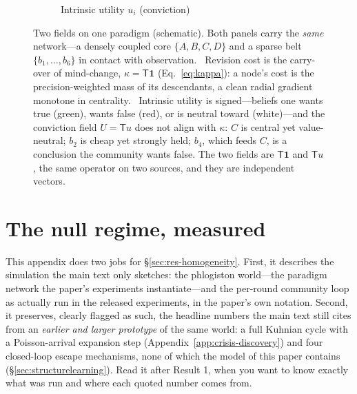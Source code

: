 \documentclass[runningheads]{llncs}
\newcommand{\Top}{\mathsf{T}}          %
\newcommand{\bone}{\mathbf{1}}         %
\begin{document}
\begin{figure}[h!]
\begin{subfigure}{0.49\textwidth}
\caption{Intrinsic utility $u_i$ (conviction)}
\label{sub:util}
\end{subfigure}
\caption{Two fields on one paradigm (schematic). Both panels carry the \emph{same} network---a densely
coupled core $\{A,B,C,D\}$ and a sparse belt $\{b_1,\dots,b_6\}$ in contact with observation.
~Revision cost is the carry-over of mind-change, $\kappa=\Top\bone$
(Eq.~\ref{eq:kappa}): a node's cost is the precision-weighted mass of its descendants, a clean radial
gradient monotone in centrality. ~Intrinsic utility is signed---beliefs one wants
true (green), wants false (red), or is neutral toward (white)---and the conviction field
$U=\Top u$ does not align with $\kappa$: $C$ is central yet value-neutral; $b_2$ is cheap yet strongly
held; $b_4$, which feeds $C$, is a conclusion the community wants false. The two fields are
$\Top\bone$ and $\Top u$, the same operator on two sources, and they are independent vectors.}
\label{fig:twofields}
\end{figure}

\section{The null regime, measured}
\label{app:null}

This appendix does two jobs for \S\ref{sec:res-homogeneity}. First, it describes the
simulation the main text only sketches: the phlogiston world---the paradigm network the
paper's experiments instantiate---and the per-round community loop as actually run in the
released experiments, in the paper's own notation. Second, it preserves, clearly flagged as
such, the headline numbers the main text still cites from an \emph{earlier and larger
prototype} of the same world: a full Kuhnian cycle with a Poisson-arrival expansion step
(Appendix~\ref{app:crisis-discovery}) and four closed-loop escape mechanisms, none of which
the model of this paper contains (\S\ref{sec:structurelearning}). Read it after Result 1,
when you want to know exactly what was run and where each quoted number comes from.
\end{document}
